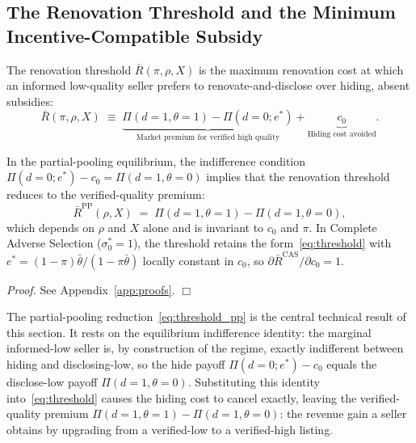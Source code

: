 \documentclass[10pt,letterpaper]{bp-template-concise}
\begin{document}
\subsection{The Renovation Threshold and the Minimum Incentive-Compatible Subsidy}

\begin{definition}
The renovation threshold $\bar{R}(\pi,\rho,X)$ is the maximum renovation cost at which an informed low-quality seller prefers to renovate-and-disclose over hiding, absent subsidies:
\begin{equation}
    \bar{R}(\pi,\rho,X)\;\equiv\;\underbrace{\Pi(d=1,\theta=1)-\Pi(d=0;e^*)}_{\text{Market premium for verified high quality}}+\underbrace{c_0}_{\text{Hiding cost avoided}}.
    \label{eq:threshold}
\end{equation}
\end{definition}

\begin{lemma}
\label{lem:threshold_regimes}
In the partial-pooling equilibrium, the indifference condition $\Pi(d=0;e^*) - c_0 = \Pi(d=1,\theta=0)$ implies that the renovation threshold reduces to the verified-quality premium:
\begin{equation}
    \bar{R}^{\text{PP}}(\rho,X) \;=\; \Pi(d=1,\theta=1) - \Pi(d=1,\theta=0),
    \label{eq:threshold_pp}
\end{equation}
which depends on $\rho$ and $X$ alone and is invariant to $c_0$ and $\pi$. In Complete Adverse Selection ($\sigma_0^*=1$), the threshold retains the form~\eqref{eq:threshold} with $e^* = (1-\pi)\bar\theta/(1-\pi\bar\theta)$ locally constant in $c_0$, so $\partial \bar R^{\text{CAS}}/\partial c_0 = 1$.
\end{lemma}

\noindent\textit{Proof.} See Appendix~\ref{app:proofs}. $\Box$

\medskip

The partial-pooling reduction~\eqref{eq:threshold_pp} is the central technical result of this section. It rests on the equilibrium indifference identity: the marginal informed-low seller is, by construction of the regime, exactly indifferent between hiding and disclosing-low, so the hide payoff $\Pi(d=0;e^*) - c_0$ equals the disclose-low payoff $\Pi(d=1,\theta=0)$. Substituting this identity into~\eqref{eq:threshold} causes the hiding cost to cancel exactly, leaving the verified-quality premium $\Pi(d=1,\theta=1) - \Pi(d=1,\theta=0)$: the revenue gain a seller obtains by upgrading from a verified-low to a verified-high listing.
\end{document}

